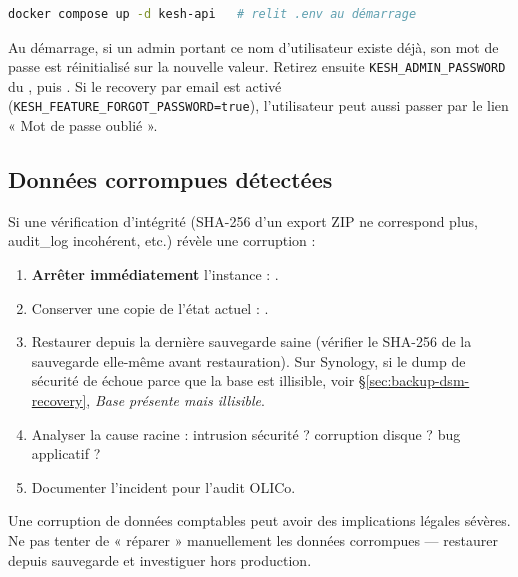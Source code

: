 \documentclass[a4paper,11pt,oneside]{article}
\begin{document}
\begin{lstlisting}[language=bash]
docker compose up -d kesh-api   # relit .env au démarrage
\end{lstlisting}

\begin{sloppypar}
Au démarrage, si un admin portant ce nom d'utilisateur existe déjà, son mot de
passe est réinitialisé sur la nouvelle valeur. Retirez ensuite
\texttt{KESH\_ADMIN\_PASSWORD} du , puis
. Si le recovery par email est
activé (\texttt{KESH\_FEATURE\_FORGOT\_PASSWORD=true}), l'utilisateur peut aussi
passer par le lien « Mot de passe oublié ».
\end{sloppypar}

\subsection{Données corrompues détectées}

Si une vérification d'intégrité (SHA-256 d'un export ZIP ne correspond plus, audit\_log incohérent, etc.) révèle une corruption :

\begin{enumerate}
    \item \textbf{Arrêter immédiatement} l'instance : .
    \item Conserver une copie de l'état actuel : .
    \item Restaurer depuis la dernière sauvegarde saine (vérifier le SHA-256 de la sauvegarde elle-même avant restauration). Sur Synology, si le dump de sécurité de  échoue parce que la base est illisible, voir \S\ref{sec:backup-dsm-recovery}, \emph{Base présente mais illisible}.
    \item Analyser la cause racine : intrusion sécurité ? corruption disque ? bug applicatif ?
    \item Documenter l'incident pour l'audit OLICo.
\end{enumerate}

\begin{keshdanger}
Une corruption de données comptables peut avoir des implications légales sévères. Ne pas tenter de « réparer » manuellement les données corrompues — restaurer depuis sauvegarde et investiguer hors production.
\end{keshdanger}

\end{document}
